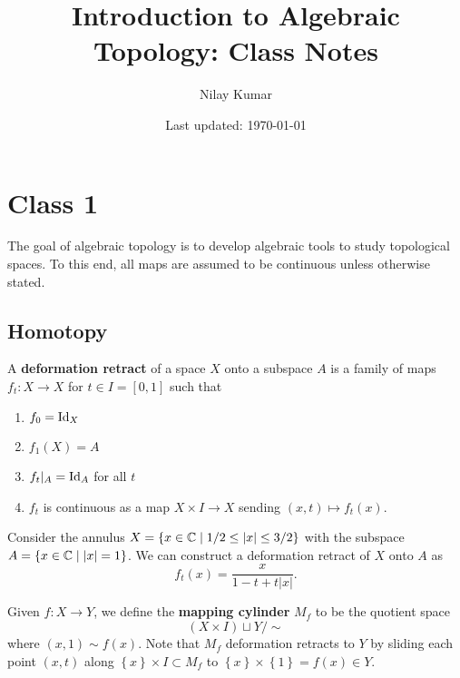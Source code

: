 \documentclass{../mathnotes}
\title{Introduction to Algebraic Topology: Class Notes}
\author{Nilay Kumar}
\date{Last updated: \today}
\begin{document}
\maketitle


\section{Class 1}
\begin{rem}
    The goal of algebraic topology is to develop algebraic tools to study topological spaces. To this end, all maps are assumed
    to be continuous unless otherwise stated.
\end{rem}

\subsection{Homotopy}

\begin{defn}
    A \textbf{deformation retract} of a space $X$ onto a subspace $A$ is a family of maps
    $f_t:X\to X$ for $t\in I=[0,1]$ such that
    \begin{enumerate}
        \item $f_0=\operatorname{Id}_X$
        \item $f_1(X)=A$
        \item $f_t|_A=\operatorname{Id}_A$ for all $t$
        \item $f_t$ is continuous as a map $X\times I\to X$ sending $(x,t)\mapsto f_t(x)$.
    \end{enumerate}

\end{defn}

\begin{exmp}
    Consider the annulus $X=\left\{ x\in\mathbb{C} \mid 1/2\leq|x|\leq 3/2 \right\}$ with the subspace
    $A=\left\{ x\in\mathbb{C} \mid |x|=1 \right\}$. We can construct a deformation retract of $X$ onto $A$ as
    \[f_t(x)=\frac{x}{1-t+t|x|}.\]
\end{exmp}

\begin{defn}
    Given $f:X\to Y$, we define the \textbf{mapping cylinder} $M_f$ to be the quotient space
    \[(X\times I)\sqcup Y/\sim\]
    where $(x,1)\sim f(x)$. Note that $M_f$ deformation retracts to $Y$ by sliding each point $(x,t)$ along $\left\{ x \right\}\times I\subset M_f$
    to $\left\{ x \right\}\times \left\{ 1 \right\}=f(x)\in Y$.
\end{defn}
\end{document}
